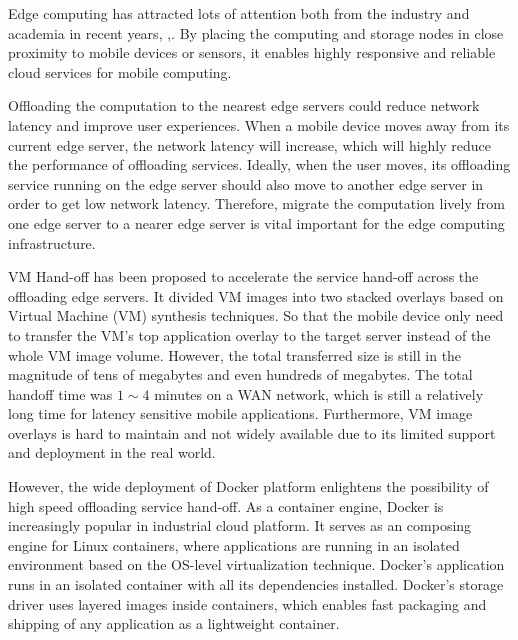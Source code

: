 
Edge computing has attracted lots of attention both from the industry and academia in recent years\cite{satya2017edge}, \cite{yi2015fog,yi2015survey},\cite{satya2009case}. By placing the computing and storage nodes in close proximity to mobile devices or sensors, it enables highly responsive and reliable cloud services for mobile computing\cite{satya2017edge}. 

Offloading the computation to the nearest edge servers could reduce network latency and improve user experiences. When a mobile device moves away from its current edge server, the network latency will increase, which will highly reduce the performance of offloading services. Ideally, when the user moves, its offloading service running on the edge server should also move to another edge server in order to get low network latency. Therefore, migrate the computation lively from one edge server to a nearer edge server is vital important for the edge computing infrastructure. 

VM Hand-off \cite{ha2015vmhandoff} has been proposed to accelerate the service hand-off across the offloading edge servers. It divided VM images into two stacked overlays based on Virtual Machine (VM) synthesis \cite{satya2009case} techniques. So that the mobile device only need to transfer the VM's top application overlay to the target server instead of the whole VM image volume. However, the total transferred size is still in the magnitude of tens of megabytes and even hundreds of megabytes. The total handoff time was $1\sim4$ minutes on a WAN network, which is still a relatively long time for latency sensitive mobile applications. Furthermore, VM image overlays is hard to maintain and not widely available due to its limited support and deployment in the real world.

However, the wide deployment of Docker platform enlightens the possibility of high speed offloading service hand-off. As a container engine, Docker is increasingly popular in industrial cloud platform. It serves as an composing engine for Linux containers, where applications are running in an isolated environment based on the OS-level virtualization technique.
Docker's application runs in an isolated container with all its dependencies installed. Docker's storage driver uses layered images inside containers, which enables fast packaging and shipping of any application as a lightweight container. 

